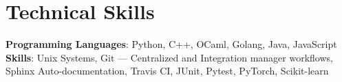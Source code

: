 \documentclass[letterpaper,11pt]{article}
\begin{document}
%
\section{Technical Skills}
 \begin{itemize}[leftmargin=0.15in, label={}]
    \small{\item{
     \textbf{Programming Languages}{:    Python, C++, OCaml, Golang, Java, JavaScript} \\
     \textbf{Skills}{: Unix Systems, Git — Centralized and Integration manager workflows, Sphinx Auto-documentation, Travis CI, JUnit, Pytest, PyTorch, Scikit-learn } \\

    }}
 \end{itemize}


\end{document}

